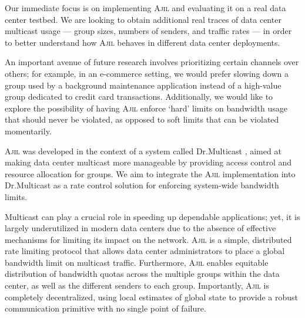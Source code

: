 \documentclass[times, 10pt,twocolumn]{article}
\newcommand{\sysname}{\textsc{Ajil}}
\begin{document}
Our immediate focus is on implementing \sysname{} and evaluating it on a real data center testbed. We are looking to obtain additional real traces of data center multicast usage --- group sizes, numbers of senders, and traffic rates --- in order to better understand how \sysname{} behaves in different data center deployments.

An important avenue of future research involves prioritizing certain channels over others; for example, in an e-commerce setting, we would prefer slowing down a group used by a background maintenance application instead of a high-value group dedicated to credit card transactions. Additionally, we would like to explore the possibility of having \sysname{} enforce `hard' limits on bandwidth usage that should never be violated, as opposed to soft limits that can be violated momentarily.

\sysname{} was developed in the context of a system called Dr.Multicast \cite{mcmd}, aimed at making data center multicast more manageable by providing access control and resource allocation for groups. We aim to integrate the \sysname{} implementation into Dr.Multicast as a rate control solution for enforcing system-wide bandwidth limits.


 \label{sec:conclusion}

Multicast can play a crucial role in speeding up dependable applications; yet, it is largely underutilized in modern data centers due to the absence of effective mechanisms for limiting its impact on the network. \sysname{} is a simple, distributed rate limiting protocol that allows data center administrators to place a global bandwidth limit on multicast traffic. Furthermore, \sysname{} enables equitable distribution of bandwidth quotas across the multiple groups within the data center, as well as the different senders to each group. Importantly, \sysname{} is completely decentralized, using local estimates of global state to provide a robust communication primitive with no single point of failure.
	


\end{document}
